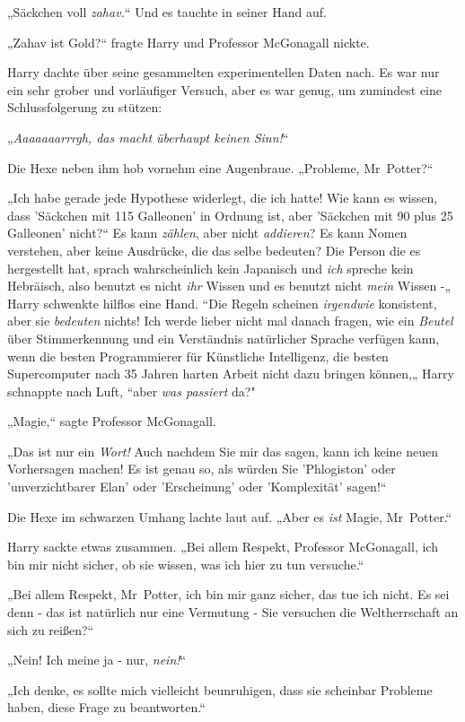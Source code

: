 {„Säckchen voll \emph{zahav.}“ Und es tauchte in seiner Hand auf.

„Zahav ist Gold?“ fragte Harry und Professor McGonagall nickte.

Harry dachte über seine gesammelten experimentellen Daten nach. Es war nur ein sehr grober und vorläufiger Versuch, aber es war genug, um zumindest eine Schlussfolgerung zu stützen:

„\emph{Aaaaaaarrrgh, das macht überhaupt keinen Sinn!}“

Die Hexe neben ihm hob vornehm eine Augenbraue. „Probleme, Mr~Potter?“

„Ich habe gerade jede Hypothese widerlegt, die ich hatte! Wie kann es wissen, dass 'Säckchen mit 115 Galleonen' in Ordnung ist, aber 'Säckchen mit 90 plus 25 Galleonen' nicht?“ Es kann \emph{zählen}, aber nicht \emph{addieren}? Es kann Nomen verstehen, aber keine Ausdrücke, die das selbe bedeuten? Die Person die es hergestellt hat, sprach wahrscheinlich kein Japanisch und \emph{ich} spreche kein Hebräisch, also benutzt es nicht \emph{ihr} Wissen und es benutzt nicht \emph{mein} Wissen -„ Harry schwenkte hilflos eine Hand. “Die Regeln scheinen \emph{irgendwie} konsistent, aber sie \emph{bedeuten} nichts! Ich werde lieber nicht mal danach fragen, wie ein \emph{Beutel} über Stimmerkennung und ein Verständnis natürlicher Sprache verfügen kann, wenn die besten Programmierer für Künstliche Intelligenz, die besten Supercomputer nach 35 Jahren harten Arbeit nicht dazu bringen können,„ Harry schnappte nach Luft, “aber \emph{was passiert} da?"

„Magie,“ sagte Professor McGonagall.

„Das ist nur ein \emph{Wort!} Auch nachdem Sie mir das sagen, kann ich keine neuen Vorhersagen machen! Es ist genau so, als würden Sie 'Phlogiston' oder 'unverzichtbarer Elan' oder 'Erscheinung' oder 'Komplexität' sagen!“

Die Hexe im schwarzen Umhang lachte laut auf. „Aber es \emph{ist} Magie, Mr~Potter.“

Harry sackte etwas zusammen. „Bei allem Respekt, Professor McGonagall, ich bin mir nicht sicher, ob sie wissen, was ich hier zu tun versuche.“

„Bei allem Respekt, Mr~Potter, ich bin mir ganz sicher, das tue ich nicht. Es sei denn - das ist natürlich nur eine Vermutung - Sie versuchen die Weltherrschaft an sich zu reißen?“

„Nein! Ich meine ja - nur, \emph{nein!}“

„Ich denke, es sollte mich vielleicht beunruhigen, dass sie scheinbar Probleme haben, diese Frage zu beantworten.“

}
